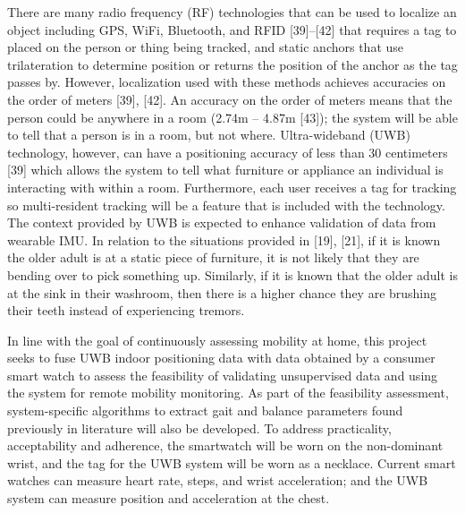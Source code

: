 There are many radio frequency (RF) technologies that can be used to localize an object 
including GPS, WiFi, Bluetooth, and RFID [39]–[42] that requires a tag to placed on the 
person or thing being tracked, and static anchors that use trilateration to determine position 
or returns the position of the anchor as the tag passes by. However, localization used with 
these methods achieves accuracies on the order of meters [39], [42]. An accuracy on the order 
of meters means that the person could be anywhere in a room (2.74m – 4.87m [43]); the system 
will be able to tell that a person is in a room, but not where. Ultra-wideband (UWB) technology, 
however, can have a positioning accuracy of less than 30 centimeters [39] which allows the system 
to tell what furniture or appliance an individual is interacting with within a room. Furthermore, 
each user receives a tag for tracking so multi-resident tracking will be a feature that is 
included with the technology. The context provided by UWB is expected to enhance validation of 
data from wearable IMU. In relation to the situations provided in [19], [21], if it is known the 
older adult is at a static piece of furniture, it is not likely that they are bending over to pick 
something up. Similarly, if it is known that the older adult is at the sink in their washroom, then 
there is a higher chance they are brushing their teeth instead of experiencing tremors.

In line with the goal of continuously assessing mobility at home, this project seeks to fuse 
UWB indoor positioning data with data obtained by a consumer smart watch to assess the 
feasibility of validating unsupervised data and using the system for remote mobility monitoring. 
As part of the feasibility assessment, system-specific algorithms to extract gait and balance 
parameters found previously in literature will also be developed. To address practicality, 
acceptability and adherence, the smartwatch will be worn on the non-dominant wrist, and the 
tag for the UWB system will be worn as a necklace. Current smart watches can measure heart 
rate, steps, and wrist acceleration; and the UWB system can measure position and acceleration 
at the chest.
